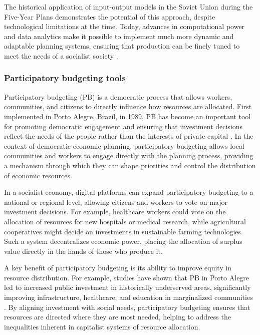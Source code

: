 \begin{refsection}
The historical application of input-output models in the Soviet Union during the Five-Year Plans demonstrates the potential of this approach, despite technological limitations at the time. Today, advances in computational power and data analytics make it possible to implement much more dynamic and adaptable planning systems, ensuring that production can be finely tuned to meet the needs of a socialist society \cite[pp.~82]{devine2020democracy}.

\subsubsection{Participatory budgeting tools}

Participatory budgeting (PB) is a democratic process that allows workers, communities, and citizens to directly influence how resources are allocated. First implemented in Porto Alegre, Brazil, in 1989, PB has become an important tool for promoting democratic engagement and ensuring that investment decisions reflect the needs of the people rather than the interests of private capital \cite[pp.~13]{baiocchi2003radicals}. In the context of democratic economic planning, participatory budgeting allows local communities and workers to engage directly with the planning process, providing a mechanism through which they can shape priorities and control the distribution of economic resources.

In a socialist economy, digital platforms can expand participatory budgeting to a national or regional level, allowing citizens and workers to vote on major investment decisions. For example, healthcare workers could vote on the allocation of resources for new hospitals or medical research, while agricultural cooperatives might decide on investments in sustainable farming technologies. Such a system decentralizes economic power, placing the allocation of surplus value directly in the hands of those who produce it. 

A key benefit of participatory budgeting is its ability to improve equity in resource distribution. For example, studies have shown that PB in Porto Alegre led to increased public investment in historically underserved areas, significantly improving infrastructure, healthcare, and education in marginalized communities \cite[pp.~29]{wampler2007participatory}. By aligning investment with social needs, participatory budgeting ensures that resources are directed where they are most needed, helping to address the inequalities inherent in capitalist systems of resource allocation.


\end{refsection}
